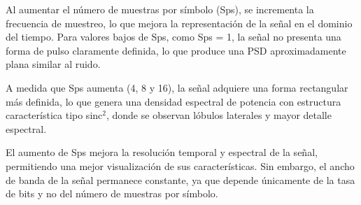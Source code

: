 Al aumentar el número de muestras por símbolo (Sps), se incrementa la frecuencia de muestreo, lo que mejora la representación de la señal en el dominio del tiempo. Para valores bajos de Sps, como Sps = 1, la señal no presenta una forma de pulso claramente definida, lo que produce una PSD aproximadamente plana similar al ruido.

A medida que Sps aumenta (4, 8 y 16), la señal adquiere una forma rectangular más definida, lo que genera una densidad espectral de potencia con estructura característica tipo sinc$^2$, donde se observan lóbulos laterales y mayor detalle espectral.

El aumento de Sps mejora la resolución temporal y espectral de la señal, permitiendo una mejor visualización de sus características. Sin embargo, el ancho de banda de la señal permanece constante, ya que depende únicamente de la tasa de bits y no del número de muestras por símbolo.

